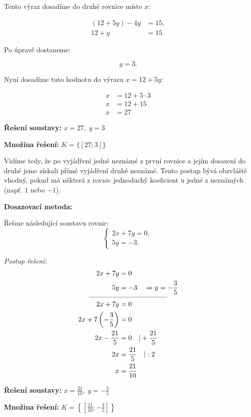 \documentclass[12pt,a4paper]{article}
\begin{document}
Tento výraz dosadíme do druhé rovnice místo \(x\):

\begin{align*}
(12 + 5y) - 4y &= 15,\\
12 + y &= 15.
\end{align*}

Po úpravě dostaneme:

\[
y = 3.
\]

Nyní dosadíme tuto hodnotu do výrazu \(x = 12 + 5y\):

\begin{align*}
x &= 12 + 5\cdot 3\\
x &= 12 + 15\\
x &= 27
\end{align*}

\textbf{Řešení soustavy:} \quad \(x = 27,\; y = 3\)

\medskip
\textbf{Množina řešení:} \quad \(K = \{[27;3]\}\)

\medskip
Vidíme tedy, že po vyjádření jedné neznámé z první rovnice a jejím dosazení do druhé  
jsme získali přímé vyjádření druhé neznámé. Tento postup bývá obzvláště vhodný, pokud má některá z rovnic jednoduchý koeficient u jedné z neznámých (např. \(1\) nebo \(-1\)).

\begin{examplebox}
\textbf{Dosazovací metoda:}

Řešme následující soustavu rovnic:
\[
\begin{cases}
2x + 7y = 0,\\
5y = -3.
\end{cases}
\]

\textit{Postup řešení:}
\begin{align*}
  2x + 7y &= 0\\
  5y &= -3 \quad \Rightarrow y=-\frac{3}{5}\\[-4pt]
  \multicolumn{2}{c}{\rule{4cm}{0.3pt}} \\[-2pt]
  2x + 7y &= 0\\
  2x + 7\left(-\frac{3}{5}\right) &= 0\\
  2x - \frac{21}{5} &= 0 \quad | +\frac{21}{5}\\
  2x &= \frac{21}{5} \quad | :2\\
  x &= \frac{21}{10}
\end{align*}

\textbf{Řešení soustavy:} \quad \(x = \tfrac{21}{10},\; y = -\tfrac{3}{5}\)

\medskip
\textbf{Množina řešení:} \quad \(K = \left\{\left[\tfrac{21}{10}; -\tfrac{3}{5}\right]\right\}\)
\end{examplebox}
\end{document}

